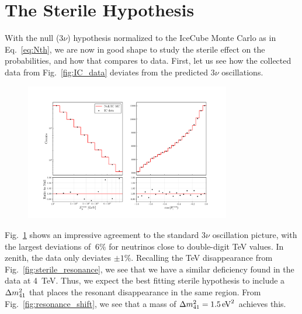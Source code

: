 % 

% 
\section{The Sterile Hypothesis}
With the null ($3\nu$) hypothesis normalized to the IceCube Monte Carlo as in Eq.~\ref{eq:Nth}, we are now in good shape to study the sterile effect on the probabilities, and how that compares to data.
First, let us see how the collected data from Fig.~\ref{fig:IC_data} deviates from the predicted $3\nu$ oscillations.
\begin{figure}
    \centering
    \includegraphics[width=0.8\textwidth]{figures/IC_rates.pdf}
    \caption{}\label{fig:IC_rates}
\end{figure}
Fig.~\ref{fig:IC_rates} shows an impressive agreement to the standard $3\nu$ oscillation picture, with the largest deviations of $~6\%$
for neutrinos close to double-digit \si{\TeV} values. In zenith, the data only deviates $\pm 1\%$. Recalling the \si{\TeV} disappearance from 
Fig.~\ref{fig:sterile_resonance}, we see that we have a similar deficiency found in the data at \SI{4}{\TeV}. Thus, we expect the best fitting 
sterile hypothesis to include a $\dm[41]$ that places the resonant disappearance in the same region. From Fig.~\ref{fig:resonance_shift}, we see
that a mass of $\dm[41] = \SI{1.5}{\eV \squared}$ achieves this. 


